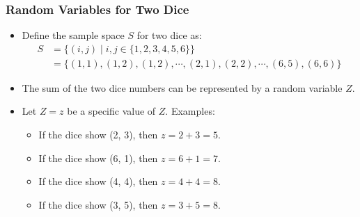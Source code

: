 \documentclass[handout]{beamer} %
\begin{document}
\begin{frame}
    \frametitle{Random Variables for Two Dice}
    \begin{itemize}
        \item Define the sample space \( S \) for two dice as: \pause
        \begin{align*}
        S &= \big\{(i, j) \mid i, j \in \big\{1, 2, 3, 4, 5, 6\big\}\big\} \\
          &= \big\{(1,1), (1,2), (1,2), \cdots, (2,1), (2,2), \cdots, (6,5), (6,6)\big\}
        \end{align*}
        \pause \vspace{-1.5em}
        \item The sum of the two dice numbers can be represented by a random variable \( Z \). \pause
        \item Let $Z=z$ be a specific value of $Z$. Examples: \pause
        \begin{itemize}
            \item If the dice show (2, 3), then \( z = 2 + 3 = 5 \). \pause
            \item If the dice show (6, 1), then \( z = 6 + 1 = 7 \). \pause
            \item If the dice show (4, 4), then \( z = 4 + 4 = 8 \). \pause
            \item If the dice show (3, 5), then \( z = 3 + 5 = 8 \). \pause
        \end{itemize}
    \end{itemize}
\end{frame}
\end{document}
